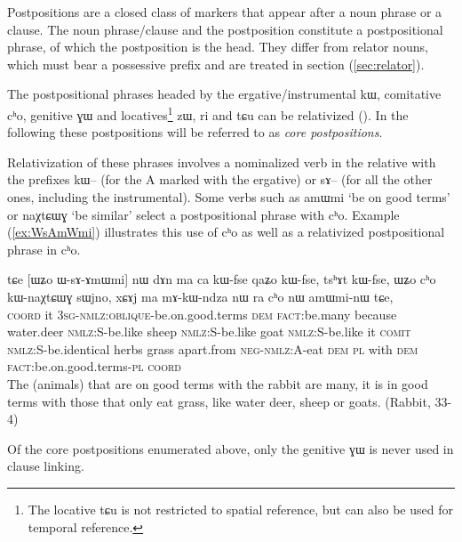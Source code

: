 \documentclass[oldfontcommands,oneside,a4paper,11pt]{article}
\newcommand{\ipa}[1]{{\phon \mbox{#1}}} %
\newcommand{\refb}[1]{(\ref{#1})}
\begin{document}
Postpositions are a closed class of markers that appear after a noun phrase or a clause. The noun phrase/clause and the postposition constitute a postpositional phrase, of which the postposition is the head. They differ from relator nouns, which must bear a possessive prefix and are treated in section \refb{sec:relator}.  

The   postpositional phrases headed by the  ergative/instrumental \ipa{kɯ}, comitative \ipa{cʰo}, genitive \ipa{ɣɯ} and  locatives\footnote{The locative \ipa{tɕu} is not restricted to spatial reference, but can also be used for temporal reference. } \ipa{zɯ}, \ipa{ri} and \ipa{tɕu} can be relativized  (\citealt{jacques14relatives}). In the following these postpositions will be referred to as \textit{core postpositions}.

Relativization of these phrases involves a nominalized verb in the relative with the prefixes \ipa{kɯ--} (for the A marked with the ergative) or \ipa{sɤ--} (for all the other ones, including the instrumental). Some verbs  such as \ipa{amɯmi} `be on good terms' or \ipa{naχtɕɯɣ} `be similar' select a postpositional phrase with \ipa{cʰo}. Example \refb{ex:WsAmWmi} illustrates this use of \ipa{cʰo} as well as a relativized postpositional phrase in \ipa{cʰo}.

\begin{exe}
   \ex \label{ex:WsAmWmi}
 \gll 
\ipa{tɕe}   	[\ipa{ɯʑo}   	\ipa{ɯ-sɤ-ɤmɯmi}]   	\ipa{nɯ}   	\ipa{dɤn}   	\ipa{ma}   	\ipa{ca}   	\ipa{kɯ-fse}   	\ipa{qaʑo}   	\ipa{kɯ-fse,}   	\ipa{tsʰɤt}   	\ipa{kɯ-fse,}   	 \ipa{ɯʑo}   	\ipa{cʰo}   	\ipa{kɯ-naχtɕɯɣ}   	\ipa{sɯjno,}   	\ipa{xɕɤj}   	\ipa{ma}   	\ipa{mɤ-kɯ-ndza}   	\ipa{nɯ} \ipa{ra}   	\ipa{cʰo}   	\ipa{nɯ}   	\ipa{amɯmi-nɯ}   	\ipa{tɕe,}   \\
\textsc{coord} it \textsc{3sg-nmlz:oblique}-be.on.good.terms \textsc{dem} \textsc{fact:}be.many because water.deer \textsc{nmlz:S}-be.like sheep \textsc{nmlz:S}-be.like goat  \textsc{nmlz:S}-be.like it \textsc{comit}  \textsc{nmlz:S}-be.identical herbs grass apart.from \textsc{neg-nmlz:A}-eat \textsc{dem} \textsc{pl} with \textsc{dem} \textsc{fact}:be.on.good.terms-\textsc{pl} \textsc{coord} \\
\glt The (animals) that are on good terms with the rabbit are many, it is in good terms with those that only eat grass, like water deer, sheep or goats. (Rabbit, 33-4)
\end{exe}

Of the core postpositions enumerated above, only the genitive \ipa{ɣɯ} is never used in clause linking.
\end{document}
